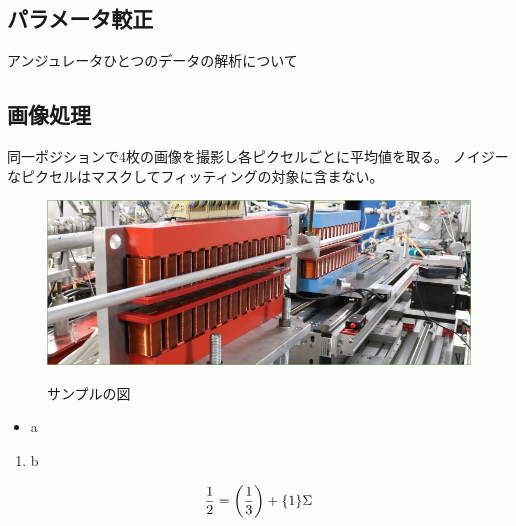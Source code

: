 \documentclass[a4paper,11pt,uplatex]{jsarticle}
\begin{document}
\subsection{パラメータ較正}
アンジュレータひとつのデータの解析について



\subsection{画像処理}
同一ポジションで4枚の画像を撮影し各ピクセルごとに平均値を取る。
ノイジーなピクセルはマスクしてフィッティングの対象に含まない。









\clearpage

\begin{figure}[tb]
  \centering
  \includegraphics[width=0.8\linewidth]{image/1-1.jpg}\\
  \caption{サンプルの図}
  \label{sample_image}
\end{figure}

\begin{itemize}
  \item a
\end{itemize}
\begin{enumerate}
  \item b
\end{enumerate}

\begin{align}
\frac{1}{2} = \qty(\frac{1}{3}) + \qty{1}\Sigma
\end{align}
\end{document}
